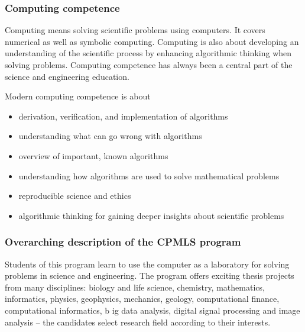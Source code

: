 \documentclass{beamer}
\begin{document}
\begin{frame}
\frametitle{Computing competence}

\begin{block}{}
Computing means solving scientific problems using computers. It covers
numerical as well as symbolic computing. Computing is also about
developing an understanding of the scientific process by enhancing
algorithmic thinking when solving problems.  Computing competence has
always been a central part of the science and engineering
education.

Modern computing competence is about

\begin{itemize}
\item derivation, verification, and implementation of algorithms

\item understanding what can go wrong with algorithms

\item overview of important, known algorithms

\item understanding how algorithms are used to solve mathematical problems

\item reproducible science and ethics

\item algorithmic thinking for gaining deeper insights about scientific problems
\end{itemize}

\noindent
\end{block}
\end{frame}

\begin{frame}
\frametitle{Overarching description of the CPMLS program}

\begin{block}{}
Students of this program learn to use the computer as a laboratory for
solving problems in science and engineering. The program offers
exciting thesis projects from many disciplines: biology and life
science, chemistry, mathematics, informatics, physics, geophysics,
mechanics, geology, computational finance, computational informatics, b
ig data analysis, digital signal processing
and image analysis – the candidates select research field according to
their interests.
\end{block}
\end{frame}
\end{document}
